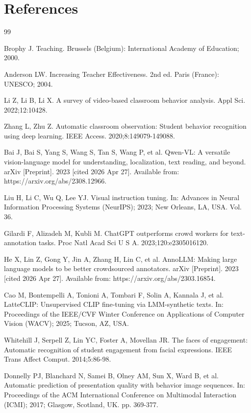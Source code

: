 \documentclass[10pt,letterpaper]{article}
\begin{document}
\section*{References}
\begin{thebibliography}{99}

Brophy J. Teaching. Brussels (Belgium): International Academy of
Education; 2000.

Anderson LW. Increasing Teacher Effectiveness. 2nd ed. Paris
(France): UNESCO; 2004.

Li Z, Li B, Li X.
A survey of video-based classroom behavior analysis.
Appl Sci. 2022;12:10428.

Zhang L, Zhu Z.
Automatic classroom observation: Student behavior recognition using
deep learning. IEEE Access. 2020;8:149079-149088.

Bai J, Bai S, Yang S, Wang S, Tan S, Wang P, et al.
Qwen-VL: A versatile vision-language model for understanding, localization,
text reading, and beyond. arXiv [Preprint]. 2023 [cited 2026 Apr 27].
Available from: https://arxiv.org/abs/2308.12966.

Liu H, Li C, Wu Q, Lee YJ.
Visual instruction tuning.
In: Advances in Neural Information Processing Systems (NeurIPS);
2023; New Orleans, LA, USA. Vol. 36.

Gilardi F, Alizadeh M, Kubli M.
ChatGPT outperforms crowd workers for text-annotation tasks.
Proc Natl Acad Sci U S A. 2023;120:e2305016120.

He X, Lin Z, Gong Y, Jin A, Zhang H, Lin C, et al.
AnnoLLM: Making large language models to be better crowdsourced annotators.
arXiv [Preprint]. 2023 [cited 2026 Apr 27]. Available from:
https://arxiv.org/abs/2303.16854.

Cao M, Bontempelli A, Tonioni A, Tombari F, Solin A, Kannala J, et al.
LatteCLIP: Unsupervised CLIP fine-tuning via LMM-synthetic texts.
In: Proceedings of the IEEE/CVF Winter Conference on Applications of
Computer Vision (WACV); 2025; Tucson, AZ, USA.

Whitehill J, Serpell Z, Lin YC, Foster A, Movellan JR.
The faces of engagement: Automatic recognition of student
engagement from facial expressions.
IEEE Trans Affect Comput. 2014;5:86-98.

Donnelly PJ, Blanchard N, Samei B, Olney AM, Sun X, Ward B, et al.
Automatic prediction of presentation quality with behavior image
sequences.
In: Proceedings of the ACM International Conference on Multimodal
Interaction (ICMI); 2017; Glasgow, Scotland, UK. pp. 369-377.


\end{thebibliography}
\end{document}
